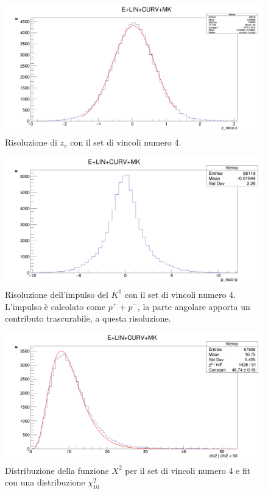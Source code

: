 \documentclass[8pt]{extarticle}
\begin{document}
\begin{figure}[h!]
	\begin{center}
		\includegraphics[scale=0.25]{set_4_z} 
		\caption{Risoluzione di $z_v$ con il set di vincoli numero 4.}
		\label{fig:set_4_z}
	\end{center}
\end{figure}

\begin{figure}[h!]
	\begin{center}
		\includegraphics[scale=0.25]{set_4_p} 
		\caption{Risoluzione dell'impulso del $K^0$ con il set di vincoli numero 4. L'impulso è calcolato come $p^+ + p^-$, la parte angolare apporta un contributo trascurabile, a questa risoluzione.}
		\label{fig:set_4_p}
	\end{center}
\end{figure}

\begin{figure}[h!]
	\begin{center}
		\includegraphics[scale=0.25]{set_4_chi2} 
		\caption{Distribuzione della funzione $X^2$ per il set di vincoli numero 4 e fit con una distribuzione $\chi^2_{10}$}
		\label{fig:set_4_chi2}
	\end{center}
\end{figure}
\end{document}
